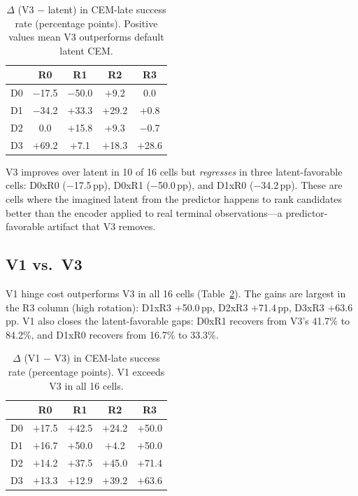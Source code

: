 \begin{table}[h]
\centering
\caption{$\Delta$ (V3 $-$ latent) in CEM-late success rate (percentage
points).  Positive values mean V3 outperforms default latent CEM.}
\label{tab:v3-delta}
\begin{tabular}{lcccc}
\toprule
 & R0 & R1 & R2 & R3 \\
\midrule
D0 & $-$17.5 & $-$50.0 & $+$9.2 & 0.0 \\
D1 & $-$34.2 & $+$33.3 & $+$29.2 & $+$0.8 \\
D2 & 0.0 & $+$15.8 & $+$9.3 & $-$0.7 \\
D3 & $+$69.2 & $+$7.1 & $+$18.3 & $+$28.6 \\
\bottomrule
\end{tabular}
\end{table}

V3 improves over latent in 10 of 16 cells but \emph{regresses} in three
latent-favorable cells: D0xR0 ($-$17.5\,pp), D0xR1 ($-$50.0\,pp), and D1xR0
($-$34.2\,pp).  These are cells where the imagined latent from the predictor
happens to rank candidates better than the encoder applied to real terminal
observations---a predictor-favorable artifact that V3 removes.

\subsection{V1 vs.\ V3}
\label{app:v1_vs_v3}

V1 hinge cost outperforms V3 in all 16 cells (Table~\ref{tab:v1-delta}).
The gains are largest in the R3 column (high rotation): D1xR3 $+$50.0\,pp,
D2xR3 $+$71.4\,pp, D3xR3 $+$63.6\,pp.  V1 also closes the
latent-favorable gaps: D0xR1 recovers from V3's 41.7\% to 84.2\%, and D1xR0
recovers from 16.7\% to 33.3\%.

\begin{table}[h]
\centering
\caption{$\Delta$ (V1 $-$ V3) in CEM-late success rate (percentage points).
V1 exceeds V3 in all 16 cells.}
\label{tab:v1-delta}
\begin{tabular}{lcccc}
\toprule
 & R0 & R1 & R2 & R3 \\
\midrule
D0 & $+$17.5 & $+$42.5 & $+$24.2 & $+$50.0 \\
D1 & $+$16.7 & $+$50.0 & $+$4.2 & $+$50.0 \\
D2 & $+$14.2 & $+$37.5 & $+$45.0 & $+$71.4 \\
D3 & $+$13.3 & $+$12.9 & $+$39.2 & $+$63.6 \\
\bottomrule
\end{tabular}
\end{table}

